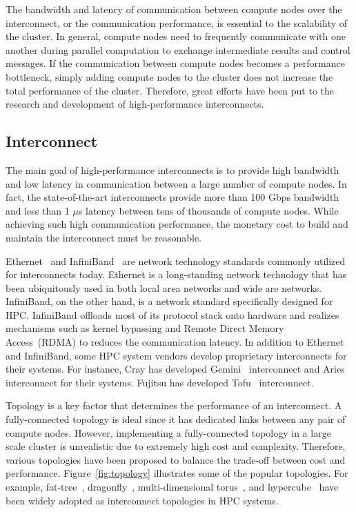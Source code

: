 The bandwidth and latency of communication between compute nodes over the
interconnect, or the communication performance, is essential to the
scalability of the cluster. In general, compute nodes need to frequently
communicate with one another during parallel computation to exchange
intermediate results and control messages. If the communication between
compute nodes becomes a performance bottleneck, simply adding compute nodes to
the cluster does not increase the total performance of the cluster. Therefore,
great efforts have been put to the research and development of
high-performance interconnects.

\subsection{Interconnect}\label{sec:i-interconnect}

The main goal of high-performance interconnects is to provide high bandwidth
and low latency in communication between a large number of compute nodes.
In fact, the state-of-the-art interconnects provide more than 100 Gbps
bandwidth and less than 1 $\mu$s latency between tens of thousands of compute
nodes. While achieving such high communication performance, the monetary cost
to build and maintain the interconnect must be reasonable.

Ethernet~\autocite{Trowbridge2007} and InfiniBand~\autocite{Buyya2009} are
network technology standards commonly utilized for interconnects today.
Ethernet is a long-standing network technology that has been ubiquitously used
in both local area networks and wide are networks. InfiniBand, on the other
hand, is a network standard specifically designed for HPC\@. InfiniBand
offloads most of its protocol stack onto hardware and realizes mechanisms such
as kernel bypassing and Remote Direct Memory Access~(RDMA) to reduces the
communication latency. In addition to Ethernet and InfiniBand, some HPC system
vendors develop proprietary interconnects for their systems. For instance,
Cray has developed Gemini~\autocite{Alverson2010} interconnect and
Aries~\autocite{Faanes2012} interconnect for their systems. Fujitsu has
developed Tofu~\autocite{Ajima2012} interconnect.

Topology is a key factor that determines the performance of an interconnect.
A fully-connected topology is ideal since it has dedicated links between any
pair of compute nodes. However, implementing a fully-connected topology in a
large scale cluster is unrealistic due to extremely high cost and complexity.
Therefore, various topologies have been proposed to balance the trade-off
between cost and performance. Figure~\ref{fig:topology} illustrates some of
the popular topologies. For example, fat-tree~\autocite{Leiserson1985},
dragonfly~\autocite{Kim2008}, multi-dimensional
torus~\autocite{Alverson2010,Ajima2012}, and hypercube~\autocite{Dally2003}
have been widely adopted as interconnect topologies in HPC systems.

